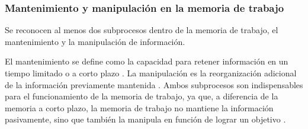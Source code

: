\documentclass[12pt,letterpaper,final]{article}
\let\cite\cite %
\begin{document}
\subsubsection{Mantenimiento y manipulación en la memoria de trabajo}

Se reconocen al menos dos subprocesos dentro de la memoria de trabajo, el mantenimiento y la manipulación de información.

El mantenimiento se define como la capacidad para retener información en un tiempo limitado o a corto plazo \cite{Eriksson2015}. La manipulación es la reorganización adicional de la información previamente mantenida \cite{Veltman2003}. Ambos subprocesos son indispensables para el funcionamiento de la memoria de trabajo, ya que, a diferencia de la memoria a corto plazo, la memoria de trabajo no mantiene la información pasivamente, sino que también la manipula en función de lograr un objetivo \cite{Dehn2008,DEsposito2015}.


\end{document}
